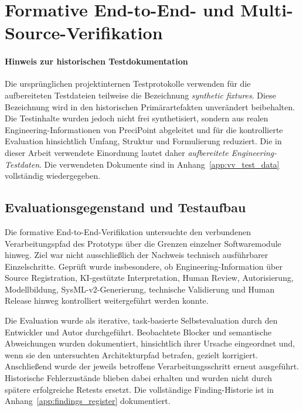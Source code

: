\section{Formative End-to-End- und Multi-Source-Verifikation}
\label{app:wp12_test_protocol}

\paragraph{Hinweis zur historischen Testdokumentation}

Die ursprünglichen projektinternen Testprotokolle verwenden für die
aufbereiteten Testdateien teilweise die Bezeichnung
\emph{synthetic fixtures}. Diese Bezeichnung wird in den historischen
Primärartefakten unverändert beibehalten. Die Testinhalte wurden jedoch nicht
frei synthetisiert, sondern aus realen Engineering-Informationen von
PreciPoint abgeleitet und für die kontrollierte Evaluation hinsichtlich
Umfang, Struktur und Formulierung reduziert. Die in dieser Arbeit verwendete
Einordnung lautet daher \emph{aufbereitete Engineering-Testdaten}. Die
verwendeten Dokumente sind in Anhang~\ref{app:vv_test_data} vollständig
wiedergegeben.

\subsection{Evaluationsgegenstand und Testaufbau}

Die formative End-to-End-Verifikation untersuchte den verbundenen
Verarbeitungspfad des Prototyps über die Grenzen einzelner Softwaremodule
hinweg. Ziel war nicht ausschließlich der Nachweis technisch ausführbarer
Einzelschritte. Geprüft wurde insbesondere, ob Engineering-Information über
Source Registration, KI-gestützte Interpretation, Human Review,
Autorisierung, Modellbildung, SysML-v2-Generierung, technische Validierung
und Human Release hinweg kontrolliert weitergeführt werden konnte.

Die Evaluation wurde als iterative, task-basierte Selbstevaluation durch den
Entwickler und Autor durchgeführt. Beobachtete Blocker und semantische
Abweichungen wurden dokumentiert, hinsichtlich ihrer Ursache eingeordnet und,
wenn sie den untersuchten Architekturpfad betrafen, gezielt korrigiert.
Anschließend wurde der jeweils betroffene Verarbeitungsschritt erneut
ausgeführt. Historische Fehlerzustände blieben dabei erhalten und wurden nicht
durch spätere erfolgreiche Retests ersetzt. Die vollständige Finding-Historie
ist in Anhang~\ref{app:findings_register} dokumentiert.

